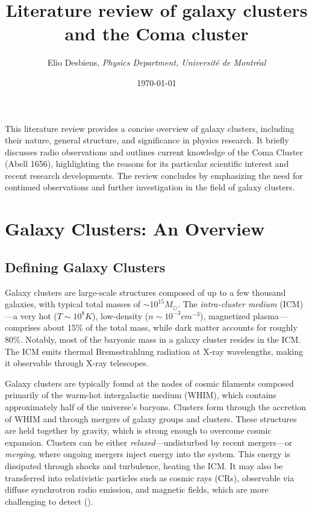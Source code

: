 \documentclass[11pt,letterpaper]{article}
\title{\textbf{Literature review of galaxy clusters and the Coma cluster}}
\author{
    Elio Desbiens, \textit{Physics Department, Université de Montréal}\\
}
\date{\today}
\begin{document}
\maketitle


\begin{onecolabstract}


\noindent This literature review provides a concise overview of galaxy clusters, including their nature, general structure, and significance in physics research. It briefly discusses radio observations and outlines current knowledge of the Coma Cluster (Abell 1656), highlighting the reasons for its particular scientific interest and recent research developments. The review concludes by emphasizing the need for continued observations and further investigation in the field of galaxy clusters.


\vspace{4mm} %
\end{onecolabstract}

\section{Galaxy Clusters: An Overview} \label{sec:galaxy_clusters}
\subsection{Defining Galaxy Clusters} \label{subsec:galaxy_clustersr_what}
\par Galaxy clusters are large-scale structures composed of up to a few thousand galaxies, with typical total masses of $\sim 10^{15}M_{\odot}$. The \textit{intra-cluster medium} (ICM)—a very hot ($T\sim 10^8 K$), low-density ($n \sim 10^{-3} cm^{-3}$), magnetized plasma—comprises about 15\% of the total mass, while dark matter accounts for roughly 80\%. Notably, most of the baryonic mass in a galaxy cluster resides in the ICM. The ICM emits thermal Bremsstrahlung radiation at X-ray wavelengths, making it observable through X-ray telescopes.

\medskip
\par Galaxy clusters are typically found at the nodes of cosmic filaments composed primarily of the warm-hot intergalactic medium (WHIM), which contains approximately half of the universe’s baryons. Clusters form through the accretion of WHIM and through mergers of galaxy groups and clusters. These structures are held together by gravity, which is strong enough to overcome cosmic expansion. Clusters can be either \textit{relaxed}—undisturbed by recent mergers—or \textit{merging}, where ongoing mergers inject energy into the system. This energy is dissipated through shocks and turbulence, heating the ICM. It may also be transferred into relativistic particles such as cosmic rays (CRs), observable via diffuse synchrotron radio emission, and magnetic fields, which are more challenging to detect (\cite{brunetti_cosmic_2014}).
\end{document}
